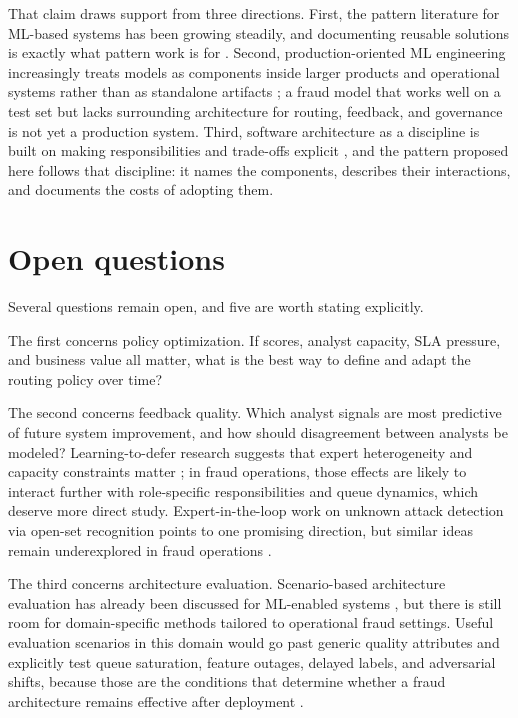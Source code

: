 \documentclass[11pt,a4paper]{article}
\begin{document}
That claim draws support from three directions. First, the pattern literature for ML-based systems has been growing steadily, and documenting reusable solutions is exactly what pattern work is for \citep{Washizaki2020, Andersen2024}. Second, production-oriented ML engineering increasingly treats models as components inside larger products and operational systems rather than as standalone artifacts \citep{Kaestner2025}; a fraud model that works well on a test set but lacks surrounding architecture for routing, feedback, and governance is not yet a production system. Third, software architecture as a discipline is built on making responsibilities and trade-offs explicit \citep{Richards2025}, and the pattern proposed here follows that discipline: it names the components, describes their interactions, and documents the costs of adopting them.

\section{Open questions}

Several questions remain open, and five are worth stating explicitly.

The first concerns policy optimization. If scores, analyst capacity, SLA pressure, and business value all matter, what is the best way to define and adapt the routing policy over time?

The second concerns feedback quality. Which analyst signals are most predictive of future system improvement, and how should disagreement between analysts be modeled? Learning-to-defer research suggests that expert heterogeneity and capacity constraints matter \citep{Alves2025}; in fraud operations, those effects are likely to interact further with role-specific responsibilities and queue dynamics, which deserve more direct study. Expert-in-the-loop work on unknown attack detection via open-set recognition points to one promising direction, but similar ideas remain underexplored in fraud operations \citep{Yuan2026}.

The third concerns architecture evaluation. Scenario-based architecture evaluation has already been discussed for ML-enabled systems \citep{Cruz2023, Nazir2024}, but there is still room for domain-specific methods tailored to operational fraud settings. Useful evaluation scenarios in this domain would go past generic quality attributes and explicitly test queue saturation, feature outages, delayed labels, and adversarial shifts, because those are the conditions that determine whether a fraud architecture remains effective after deployment \citep{Jalalvand2024, Chen2022, Lunghi2023}.
\end{document}
